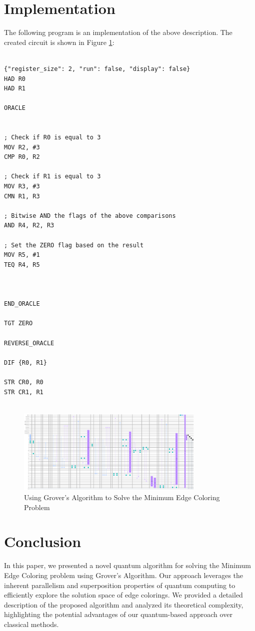 \section{Implementation}

The following program is an implementation of the above description. The created circuit is shown in Figure \ref{fig:Minimum_Edge_Coloring}:

\begin{lstlisting}

{"register_size": 2, "run": false, "display": false}
HAD R0
HAD R1

ORACLE


; Check if R0 is equal to 3
MOV R2, #3
CMP R0, R2

; Check if R1 is equal to 3
MOV R3, #3
CMN R1, R3

; Bitwise AND the flags of the above comparisons
AND R4, R2, R3

; Set the ZERO flag based on the result
MOV R5, #1
TEQ R4, R5



END_ORACLE

TGT ZERO

REVERSE_ORACLE

DIF {R0, R1}

STR CR0, R0
STR CR1, R1


\end{lstlisting}

\begin{figure}[htp]
    \centering
    \includegraphics[width=9cm]{Figures/Minimum_Edge_Coloring_circuit.png}
    \caption{Using Grover's Algorithm to Solve the Minimum Edge Coloring Problem}
    \label{fig:Minimum_Edge_Coloring}
\end{figure}

\section{Conclusion}\label{sec:conclusion}

In this paper, we presented a novel quantum algorithm for solving the Minimum Edge Coloring problem using Grover's Algorithm. Our approach leverages the inherent parallelism and superposition properties of quantum computing to efficiently explore the solution space of edge colorings. We provided a detailed description of the proposed algorithm and analyzed its theoretical complexity, highlighting the potential advantages of our quantum-based approach over classical methods.

